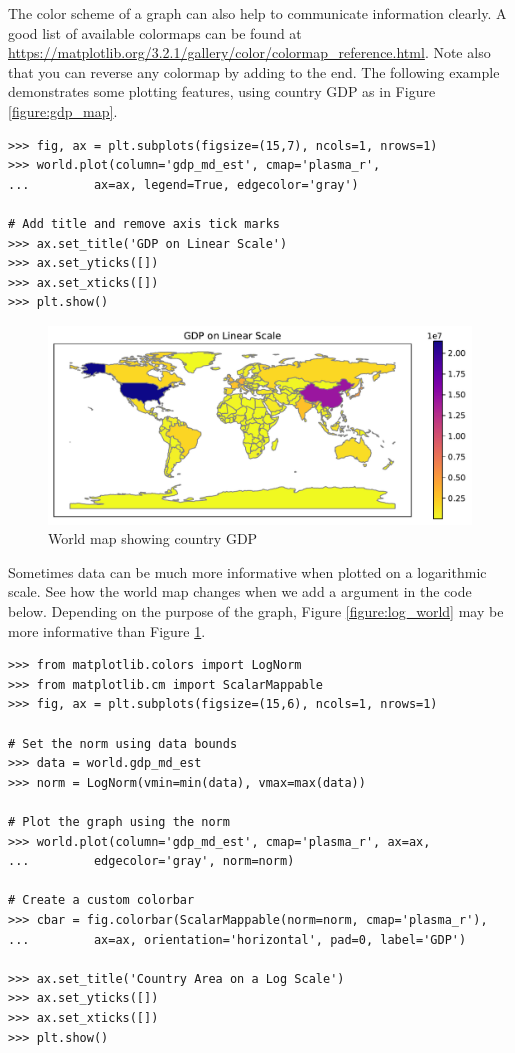 The color scheme of a graph can also help to communicate information clearly.
A good list of available colormaps can be found at \url{https://matplotlib.org/3.2.1/gallery/color/colormap_reference.html}.
Note also that you can reverse any colormap by adding  to the end.
The following example demonstrates some plotting features, using country GDP as in Figure \ref{figure:gdp_map}.

\begin{lstlisting}
>>> fig, ax = plt.subplots(figsize=(15,7), ncols=1, nrows=1)
>>> world.plot(column='gdp_md_est', cmap='plasma_r',
...			ax=ax, legend=True, edgecolor='gray')

# Add title and remove axis tick marks
>>> ax.set_title('GDP on Linear Scale')
>>> ax.set_yticks([])
>>> ax.set_xticks([])
>>> plt.show()
\end{lstlisting}

\begin{figure}[H]
\begin{center}
\includegraphics[scale=.75]{figures/world_linear.pdf}
\end{center}
\caption{World map showing country GDP}
\label{figure:linear_world}
\end{figure}

Sometimes data can be much more informative when plotted on a logarithmic scale.
See how the world map changes when we add a  argument in the code below.
Depending on the purpose of the graph, Figure \ref{figure:log_world} may be more informative than Figure \ref{figure:linear_world}.

\begin{lstlisting}
>>> from matplotlib.colors import LogNorm
>>> from matplotlib.cm import ScalarMappable
>>> fig, ax = plt.subplots(figsize=(15,6), ncols=1, nrows=1)

# Set the norm using data bounds
>>> data = world.gdp_md_est
>>> norm = LogNorm(vmin=min(data), vmax=max(data))

# Plot the graph using the norm
>>> world.plot(column='gdp_md_est', cmap='plasma_r', ax=ax,
...			edgecolor='gray', norm=norm)

# Create a custom colorbar
>>> cbar = fig.colorbar(ScalarMappable(norm=norm, cmap='plasma_r'),
...			ax=ax, orientation='horizontal', pad=0, label='GDP')

>>> ax.set_title('Country Area on a Log Scale')
>>> ax.set_yticks([])
>>> ax.set_xticks([])
>>> plt.show()
\end{lstlisting}

